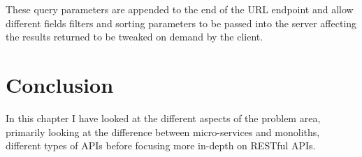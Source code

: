 These query parameters are appended to the end of the URL endpoint and allow different fields filters and sorting parameters to be passed into the server affecting the results returned to be tweaked on demand by the client.
\section{Conclusion}
In this chapter I have looked at the different aspects of the problem area, primarily looking at the difference between micro-services and monoliths, different types of APIs before focusing more in-depth on RESTful APIs.